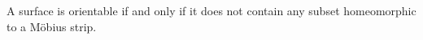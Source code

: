 \begin{proposition} \label{proposition:surface_is_orientable_if_and_only_if_it_does_not_contain_a_subset_homeomorphic_to_a_mobius_strip}
A surface is orientable if and only if it does not contain any subset homeomorphic to a Möbius strip.
\end{proposition}